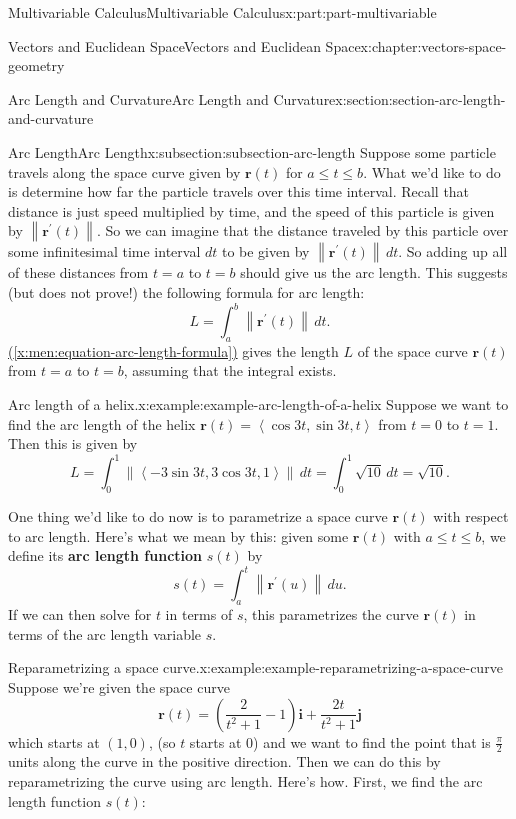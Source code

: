 \documentclass[twoside,10pt,]{tufte-book}
\newcommand{\xreffont}{\relax}
\newcommand{\terminology}[1]{\textbf{#1}}
\numberwithin{equation}{part}
\newcommand{\norm}[1]{\left\| #1 \right\|}
\newcommand{\dotprod}[1]{\left\langle #1 \right\rangle}
\begin{document}
\begin{partptx}{Multivariable Calculus}{}{Multivariable Calculus}{}{}{x:part:part-multivariable}
\begin{chapterptx}{Vectors and Euclidean Space}{}{Vectors and Euclidean Space}{}{}{x:chapter:vectors-space-geometry}
\begin{sectionptx}{Arc Length and Curvature}{}{Arc Length and Curvature}{}{}{x:section:section-arc-length-and-curvature}
\begin{subsectionptx}{Arc Length}{}{Arc Length}{}{}{x:subsection:subsection-arc-length}
Suppose some particle travels along the space curve given by \(\mathbf{r}(t)\) for \(a\leq t\leq b\). What we'd like to do is determine how far the particle travels over this time interval. Recall that distance is just speed multiplied by time, and the speed of this particle is given by \(\norm{\mathbf{r}^\prime(t)}\). So we can imagine that the distance traveled by this particle over some infinitesimal time interval \(dt\) to be given by \(\norm{\mathbf{r}^\prime(t)}\,dt\). So adding up all of these distances from \(t=a\) to \(t=b\) should give us the arc length. This suggests (but does not prove!) the following formula for arc length:%
%
\begin{equation}
L = \int_{a}^{b}\norm{\mathbf{r}^\prime(t)}\,dt.\label{x:men:equation-arc-length-formula}
\end{equation}
\hyperref[x:men:equation-arc-length-formula]{({\xreffont\ref{x:men:equation-arc-length-formula}})} gives the length \(L\) of the space curve \(\mathbf{r}(t)\) from \(t=a\) to \(t=b\), assuming that the integral exists.%
\begin{example}{Arc length of a helix.}{x:example:example-arc-length-of-a-helix}%
Suppose we want to find the arc length of the helix \(\mathbf{r}(t) = \dotprod{\cos 3t,\sin 3t, t}\) from \(t=0\) to \(t=1\). Then this is given by%
%
\begin{equation*}
L = \int_{0}^{1}\norm{\dotprod{-3\sin3t, 3\cos3t, 1}}\,dt = \int_{0}^{1}\sqrt{10}\,dt = \sqrt{10}.
\end{equation*}
\end{example}
One thing we'd like to do now is to parametrize a space curve \(\mathbf{r}(t)\) with respect to arc length. Here's what we mean by this: given some \(\mathbf{r}(t)\) with \(a\leq t\leq b\), we define its \terminology{arc length function} \(s(t)\) by%
%
\begin{equation*}
s(t) = \int_{a}^{t}\norm{\mathbf{r}^\prime(u)}\,du.
\end{equation*}
If we can then solve for \(t\) in terms of \(s\), this parametrizes the curve \(\mathbf{r}(t)\) in terms of the arc length variable \(s\).%
\begin{example}{Reparametrizing a space curve.}{x:example:example-reparametrizing-a-space-curve}%
Suppose we're given the space curve%
%
\begin{equation*}
\mathbf{r}(t) = \left(\frac{2}{t^{2}+1}-1\right)\mathbf{i}+\frac{2t}{t^{2}+1}\mathbf{j}
\end{equation*}
which starts at \((1,0)\), (so \(t\) starts at \(0\)) and we want to find the point that is \(\frac{\pi}{2}\) units along the curve in the positive direction. Then we can do this by reparametrizing the curve using arc length. Here's how. First, we find the arc length function \(s(t)\):%

\end{example}
\end{subsectionptx}
\end{sectionptx}
\end{chapterptx}
\end{partptx}
\end{document}
